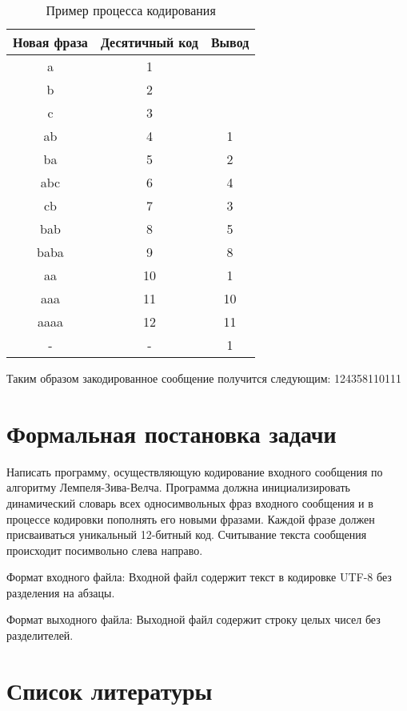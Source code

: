 \documentclass{article}
\begin{document}
\begin{table}[h]
\centering
\begin{tabular}{ |c|c|c| } 
 \hline
 Новая фраза & Десятичный код & Вывод \\
 \hline\hline
 a & 1 &  \\
 \hline
 b & 2 &  \\
 \hline
 c & 3 &  \\
 \hline
 ab & 4 & 1 \\
 \hline
 ba & 5 & 2 \\
 \hline
 abc & 6 & 4 \\
 \hline
 cb & 7 & 3 \\
 \hline
 bab & 8 & 5 \\
 \hline
 baba & 9 & 8 \\
 \hline
 aa & 10 & 1 \\
 \hline
 aaa & 11 & 10 \\
 \hline
 aaaa & 12 & 11 \\
 \hline
 - & - & 1 \\
 \hline
\end{tabular}
\caption{\label{tab:widgets}Пример процесса кодирования}
\end{table}

Таким образом закодированное сообщение получится следующим:
124358110111

\section{Формальная постановка задачи}

Написать программу, осуществляющую кодирование входного сообщения по алгоритму Лемпеля-Зива-Велча. Программа должна инициализировать динамический словарь всех односимвольных фраз входного сообщения и в процессе кодировки пополнять его новыми фразами. Каждой фразе должен присваиваться уникальный 12-битный код. Считывание текста сообщения происходит посимвольно слева направо. 

Формат входного файла:
Входной файл содержит текст в кодировке UTF-8 без разделения на абзацы.

Формат выходного файла:
Выходной файл содержит строку целых чисел без разделителей.

\section{Список литературы}
\end{document}
